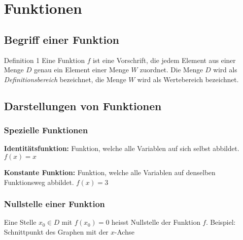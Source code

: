 \section{Funktionen}
	
	\subsection{Begriff einer Funktion}
	\begin{minipage}{1\linewidth}
		\begin{definition}{Definition 1}
			Eine Funktion $f$ ist eine Vorschrift, die jedem Element aus
			einer Menge $D$ genau ein Element einer Menge $W$ zuordnet.
			Die Menge $D$ wird als \textit{Definitionsbereich} bezeichnet, 
			die Menge $W$ wird als Wertebereich bezeichnet.
		\end{definition}
	\end{minipage}
	
	\subsection{Darstellungen von Funktionen}
	
	\subsubsection{Spezielle Funktionen}
	\begin{center}
		\begin{minipage}{1\linewidth}
		\textbf{Identitätsfunktion:} Funktion, welche alle Variablen auf sich
		selbst abbildet. $f(x)=x$ 
		\end{minipage}
		\hfill
		\begin{minipage}{1\linewidth}	
		\textbf{Konstante Funktion:} Funktion, welche alle Variablen auf
		denselben Funktionsweg abbildet. $f(x)=3$
		\end{minipage}
	\end{center}

	\subsubsection{Nullstelle einer Funktion}
	\begin{minipage}{1\linewidth}	
		Eine Stelle $x_0 \in D$ mit $f(x_0)=0$ heisst Nullstelle der Funktion $f$.
		Beispiel: Schnittpunkt des Graphen mit der $x$-Achse
	\end{minipage}

